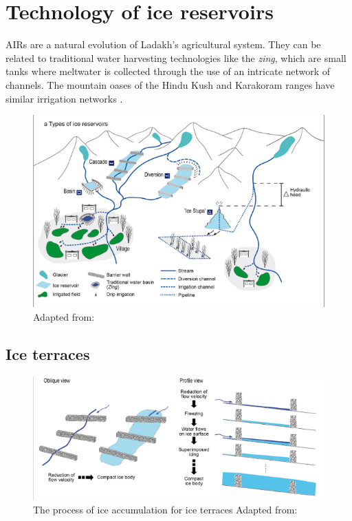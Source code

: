 \chapter{Technology of ice reservoirs}

AIRs are a natural evolution of Ladakh's agricultural system. They can be related to traditional water
harvesting technologies like the {\it zing}, which are small tanks where meltwater is collected through the use
of an intricate network of channels. The mountain oases of the Hindu Kush and Karakoram ranges
have similar irrigation networks \citep{nusserLocalKnowledgeGlobal2016}.

\begin{figure}[t]
\centering
\includegraphics[width=12cm]{figs/AIR_designs.png}

\caption{Adapted from: \cite{nusserSociohydrologyArtificialGlaciers2019}}

\label{fig:AIRdesigns}
\end{figure}

\section{Ice terraces}


\begin{figure}[t]
\centering
\includegraphics[width=12cm]{figs/IT_science.png}

\caption{ The process of ice accumulation for ice terraces Adapted from:
\cite{nusserSociohydrologyArtificialGlaciers2019}}

\label{fig:ITscience}
\end{figure}

